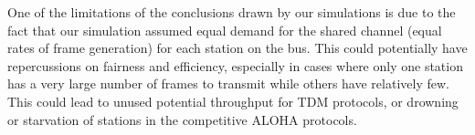 \documentclass[twocolumn]{article}
\begin{document}
One of the limitations of the conclusions drawn by our simulations is due to the fact that
our simulation assumed equal demand for the shared channel (equal rates of frame generation)
for each station on the bus. This could potentially have repercussions on fairness and 
efficiency, especially in cases where only one station has a very large number of frames 
to transmit while others have relatively few. This could lead to unused potential throughput
for TDM protocols, or drowning or starvation of stations in the competitive ALOHA protocols.
\end{document}
